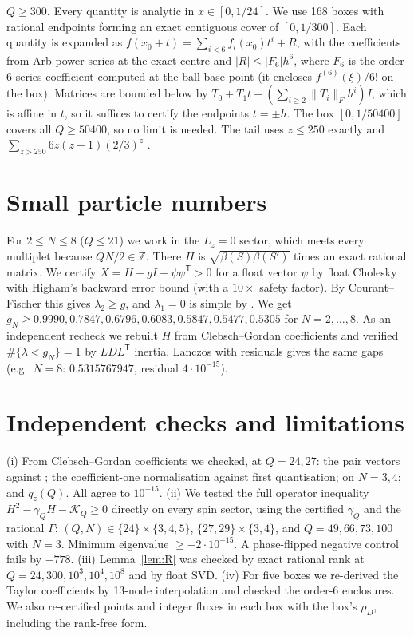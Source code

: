 \documentclass[11pt]{amsart}
\theoremstyle{remark}
\begin{document}
\textbf{$Q\ge300$.} Every quantity is analytic in $x\in[0,1/24]$. We use 168 boxes with rational endpoints forming an exact
contiguous cover of $[0,1/300]$. Each quantity is expanded as $f(x_0+t)=\sum_{i<6}f_i(x_0)t^i+R$, with the coefficients
from Arb power series at the exact centre and $|R|\le|F_6|h^6$, where $F_6$ is the order-6 series coefficient
computed at the ball base point (it encloses $f^{(6)}(\xi)/6!$ on the box). Matrices are bounded below by
$T_0+T_1t-(\sum_{i\ge2}\|T_i\|_Fh^i)I$, which is affine in $t$, so it suffices to certify the endpoints $t=\pm h$.
The box $[0,1/50400]$ covers all $Q\ge50400$, so no limit is needed. The tail uses $z\le250$ exactly and
$\sum_{z>250}6z(z+1)(2/3)^z$ \cite[Lemma~6.1]{OAI}.

\section{Small particle numbers}\label{sec:ED}
For $2\le N\le8$ ($Q\le21$) we work in the $L_z=0$ sector, which meets every multiplet because $QN/2\in\mathbb Z$.
There $H$ is $\sqrt{\beta(S)\beta(S')}$ times an exact rational matrix. We certify
$X=H-gI+\psi\psi^{\mathsf T}>0$ for a float vector $\psi$ by float Cholesky with Higham's backward
error bound \cite[Thm.~10.3]{Higham} (with a $10\times$ safety factor). By Courant--Fischer this gives $\lambda_2\ge g$,
and $\lambda_1=0$ is simple by \cite[Lemma~6.2]{OAI}. We get
$g_N\ge0.9990,0.7847,0.6796,0.6083,0.5847,0.5477,0.5305$ for $N=2,\dots,8$.
As an independent recheck we rebuilt $H$ from Clebsch--Gordan coefficients and verified
$\#\{\lambda<g_N\}=1$ by $LDL^{\mathsf T}$ inertia. Lanczos with residuals gives the same gaps
(e.g.\ $N=8$: $0.5315767947$, residual $4\cdot10^{-15}$).

\section{Independent checks and limitations}
(i) From Clebsch--Gordan coefficients we checked, at $Q=24,27$: the pair vectors against \cite[eq.~(pair)]{OAI};
the coefficient-one normalisation against first quantisation; \cite[Lemma~2.1]{OAI} on $N=3,4$; and $q_z(Q)$.
All agree to $10^{-15}$.
(ii) We tested the full operator inequality $H^2-\gamma_QH-\mathcal K_Q\ge0$ directly on every spin
sector, using the certified $\gamma_Q$ and the rational $\Gamma$: $(Q,N)\in\{24\}\times\{3,4,5\}$,
$\{27,29\}\times\{3,4\}$, and $Q=49,66,73,100$ with $N=3$. Minimum eigenvalue $\ge-2\cdot10^{-15}$. A phase-flipped
negative control fails by $-778$.
(iii) Lemma~\ref{lem:R} was checked by exact rational rank at $Q=24,300,10^3,10^4,10^8$ and by float SVD.
(iv) For five boxes we re-derived the Taylor coefficients by 13-node interpolation and checked the order-6 enclosures.
We also re-certified points and integer fluxes in each box with the box's $\rho_D$, including the rank-free form.
\end{document}

